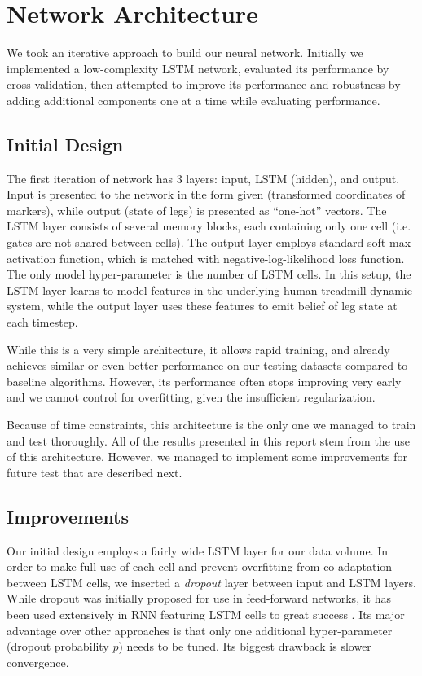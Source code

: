 \documentclass{acm_proc_article-sp}
\begin{document}
\section{Network Architecture}
\label{sec:Network Architecture}

We took an iterative approach to build our neural network. Initially we implemented a low-complexity LSTM network, evaluated its performance by cross-validation, then attempted to improve its performance and robustness by adding additional components one at a time while evaluating performance.

\subsection{Initial Design}
\label{sec:arch-simple}

The first iteration of network has 3 layers: input, LSTM (hidden), and output. Input is presented to the network in the form given (transformed coordinates of markers), while output (state of legs) is presented as ``one-hot'' vectors. The LSTM layer consists of several memory blocks, each containing only one cell (i.e. gates are not shared between cells). The output layer employs standard soft-max activation function, which is matched with negative-log-likelihood loss function. The only model hyper-parameter is the number of LSTM cells. In this setup, the LSTM layer learns to model features in the underlying human-treadmill dynamic system, while the output layer uses these features to emit belief of leg state at each timestep.

While this is a very simple architecture, it allows rapid training, and already achieves similar or even better performance on our testing datasets compared to baseline algorithms. However, its performance often stops improving very early and we cannot control for overfitting, given the insufficient regularization.

Because of time constraints, this architecture is the only one we managed to train and test thoroughly. All of the results presented in this report stem from the use of this architecture. However, we managed to implement some improvements for future test that are described next.

\subsection{Improvements}

Our initial design employs a fairly wide LSTM layer for our data volume. In order to make full use of each cell and prevent overfitting from co-adaptation between LSTM cells, we inserted a \emph{dropout} \cite{Hinton2012} layer between input and LSTM layers. While dropout was initially proposed for use in feed-forward networks, it has been used extensively in RNN featuring LSTM cells to great success \cite{Pham2013}. Its major advantage over other approaches is that only one additional hyper-parameter (dropout probability $p$) needs to be tuned. Its biggest drawback is slower convergence.
\end{document}

